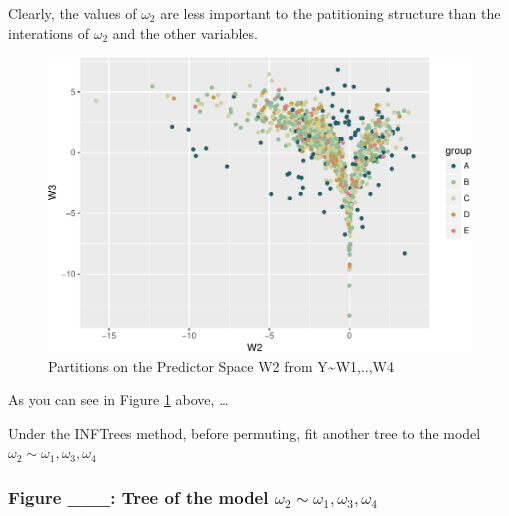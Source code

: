 \documentclass[12pt,twoside]{reedthesis}
\begin{document}
  Clearly, the values of \(\omega_2\) are less important to the
  patitioning structure than the interations of \(\omega_2\) and the other
  variables.
  
  \begin{Shaded}
  \begin{Highlighting}[]
  \NormalTok{(} 
  \StringTok{  }\NormalTok{()+}
  \StringTok{  }\NormalTok{(} 
  \end{Highlighting}
  \end{Shaded}
  
  \begin{figure}[htbp]
  \centering
  \includegraphics{Thesis_files/figure-latex/blah-1.pdf}
  \caption{\label{fig:blah}Partitions on the Predictor Space W2 from
  Y\textasciitilde{}W1,..,W4}
  \end{figure}
  
  As you can see in Figure \ref{fig:blah} above, \ldots{}
  
  Under the INFTrees method, before permuting, fit another tree to the
  model \(\omega_2 \sim \omega_1, \omega_3, \omega_4\)
  
  \subsubsection{\texorpdfstring{Figure \_\_\_: Tree of the model
  \(\omega_2 \sim \omega_1, \omega_3, \omega_4\)}{Figure \_\_\_: Tree of the model \textbackslash{}omega\_2 \textbackslash{}sim \textbackslash{}omega\_1, \textbackslash{}omega\_3, \textbackslash{}omega\_4}}\label{figure-___-tree-of-the-model-omega_2-sim-omega_1-omega_3-omega_4}
  
\end{document}
